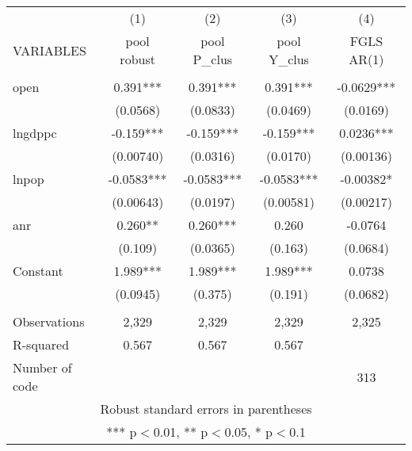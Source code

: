 \documentclass[]{article}
\begin{document}
\begin{tabular}{lcccc} \hline
 & (1) & (2) & (3) & (4) \\
VARIABLES & pool robust & pool P\_clus & pool Y\_clus & FGLS AR(1) \\ \hline
 &  &  &  &  \\
open & 0.391*** & 0.391*** & 0.391*** & -0.0629*** \\
 & (0.0568) & (0.0833) & (0.0469) & (0.0169) \\
lngdppc & -0.159*** & -0.159*** & -0.159*** & 0.0236*** \\
 & (0.00740) & (0.0316) & (0.0170) & (0.00136) \\
lnpop & -0.0583*** & -0.0583*** & -0.0583*** & -0.00382* \\
 & (0.00643) & (0.0197) & (0.00581) & (0.00217) \\
anr & 0.260** & 0.260*** & 0.260 & -0.0764 \\
 & (0.109) & (0.0365) & (0.163) & (0.0684) \\
Constant & 1.989*** & 1.989*** & 1.989*** & 0.0738 \\
 & (0.0945) & (0.375) & (0.191) & (0.0682) \\
 &  &  &  &  \\
Observations & 2,329 & 2,329 & 2,329 & 2,325 \\
R-squared & 0.567 & 0.567 & 0.567 &  \\
 Number of code &  &  &  & 313 \\ \hline
\multicolumn{5}{c}{ Robust standard errors in parentheses} \\
\multicolumn{5}{c}{ *** p$<$0.01, ** p$<$0.05, * p$<$0.1} \\
\end{tabular}
\end{document}
